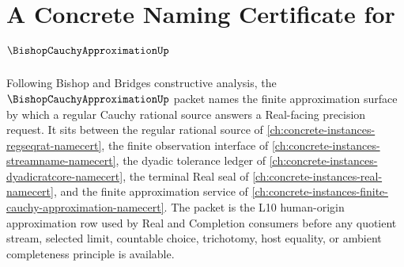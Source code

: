 \chapter{A Concrete Naming Certificate for $\BishopCauchyApproximationUp$}
\label{ch:concrete-instances-bishop-cauchy-approximation-namecert}

Following Bishop and Bridges constructive analysis, the $\BishopCauchyApproximationUp$ packet names the finite approximation surface by which a regular Cauchy rational source answers a Real-facing precision request. It sits between the regular rational source of \autoref{ch:concrete-instances-regseqrat-namecert}, the finite observation interface of \autoref{ch:concrete-instances-streamname-namecert}, the dyadic tolerance ledger of \autoref{ch:concrete-instances-dyadicratcore-namecert}, the terminal Real seal of \autoref{ch:concrete-instances-real-namecert}, and the finite approximation service of \autoref{ch:concrete-instances-finite-cauchy-approximation-namecert}. The packet is the L10 human-origin approximation row used by Real and Completion consumers before any quotient stream, selected limit, countable choice, trichotomy, host equality, or ambient completeness principle is available.

